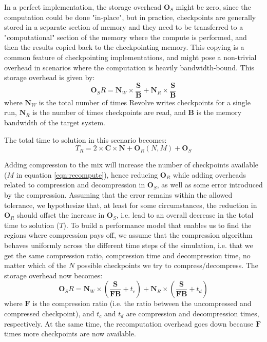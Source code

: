 \documentclass[conference]{IEEEtran}
\begin{document}
In a perfect implementation, the storage overhead $\mathbf{O}_S$ might be zero, since the computation could
be done "in-place", but in practice, checkpoints are generally stored in a separate section of memory and they
need to be transferred to a "computational" section of the memory where the compute is performed, and then
the results copied back to the checkpointing memory. This copying is a common feature of checkpointing
implementations, and might pose a non-trivial overhead in scenarios where the computation is heavily bandwidth-bound. 
This storage overhead is given by:
\begin{equation}
\mathbf{O}_SR = \mathbf{N}_W \times \frac{\mathbf{S}}{\mathbf{B}} + \mathbf{N}_R \times \frac{\mathbf{S}}{\mathbf{B}}
\label{eqn:storage}
\end{equation}
where $\mathbf{N}_W$ is the total number of times Revolve writes checkpoints for a single run, $ \mathbf{N}_R$ 
is the number of times checkpoints are read, and $\mathbf{B}$ is the memory bandwidth of the target system. 

The total time to solution in this scenario becomes:
\begin{equation}
T_R = 2 \times \mathbf{C} \times \mathbf{N} + \mathbf{O}_R(N, M) + \mathbf{O}_S
\end{equation}

Adding compression to the mix will increase the number of checkpoints available ($M$ in equation \ref{eqn:recompute}),
hence reducing $\mathbf{O}_R$ while adding overheads related to compression and decompression in $\mathbf{O}_S$,
as well as some error introduced by the compression. Assuming that the error remains within the allowed tolerance,
we hypothesize that, at least for some circumstances, the reduction in $\mathbf{O}_R$ should offset the increase in 
$\mathbf{O}_S$, i.e. lead to an overall decrease in the total time to solution ($T$). To build a performance model that
enables us to find the regions where compression pays off, we assume that the compression algorithm behaves uniformly
across the different time steps of the simulation, i.e. that we get the same compression ratio, compression time and 
decompression time, no matter which of the $N$ possible checkpoints we try to compress/decompress. The storage overhead
now becomes:
\begin{equation}
\mathbf{O}_SR = \mathbf{N}_W \times (\frac{\mathbf{S}}{\mathbf{F}\mathbf{B}} + t_c) + \mathbf{N}_R \times (\frac{\mathbf{S}}{\mathbf{F}\mathbf{B}} + t_d)
\end{equation}
where $\mathbf{F}$ is the compression ratio (i.e. the ratio between the uncompressed and compressed checkpoint), and $t_c$
and $t_d$ are compression and decompression times, respectively. At the same time, the recomputation overhead goes down
because $\mathbf{F}$ times more checkpoints are now available.
\end{document}
